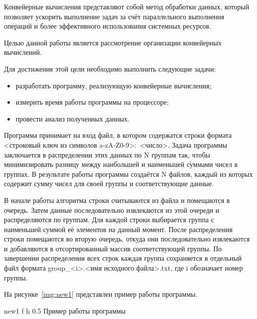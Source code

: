 
Конвейерные вычисления представляют собой метод обработки данных, который позволяет ускорить выполнение задач за счёт параллельного выполнения операций и более эффективного использования системных ресурсов.

Целью данной работы является рассмотрение организации конвейерных вычислений.

Для достижения этой цели необходимо выполнить следующие задачи:
\begin{itemize}[label=---]
	\item разработать программу, реализующую конвейерные вычисления;
	\item измерить время работы программы на процессоре;
	\item провести анализ полученных данных.
\end{itemize}


Программа принимает на вход файл, в котором содержатся строки формата <строковый ключ из символов a-zA-Z0-9>:~<число>. Задача программы заключается в распределении этих данных по N группам так, чтобы минимизировать разницу между наибольшей и наименьшей суммами чисел в группах. В результате работы программы создаётся N файлов, каждый из которых содержит сумму чисел для своей группы и соответствующие данные.


В начале работы алгоритма строки считываются из файла и помещаются в очередь. Затем данные последовательно извлекаются из этой очереди и распределяются по группам. Для каждой строки выбирается группа с наименьшей суммой её элементов на данный момент. После распределения строки помещаются во вторую очередь, откуда они последовательно извлекаются и добавляются в отсортированный массив соответствующей группы. По завершении распределения всех строк каждая группа сохраняется в отдельный файл формата group\_<i>.<имя исходного файла>.txt, где i обозначает номер группы.


На рисунке~\ref{img:new1} представлен пример работы программы.

{new1} %
{f} %
{h} %
{0.5\textwidth} %
{Пример работы программы} %

